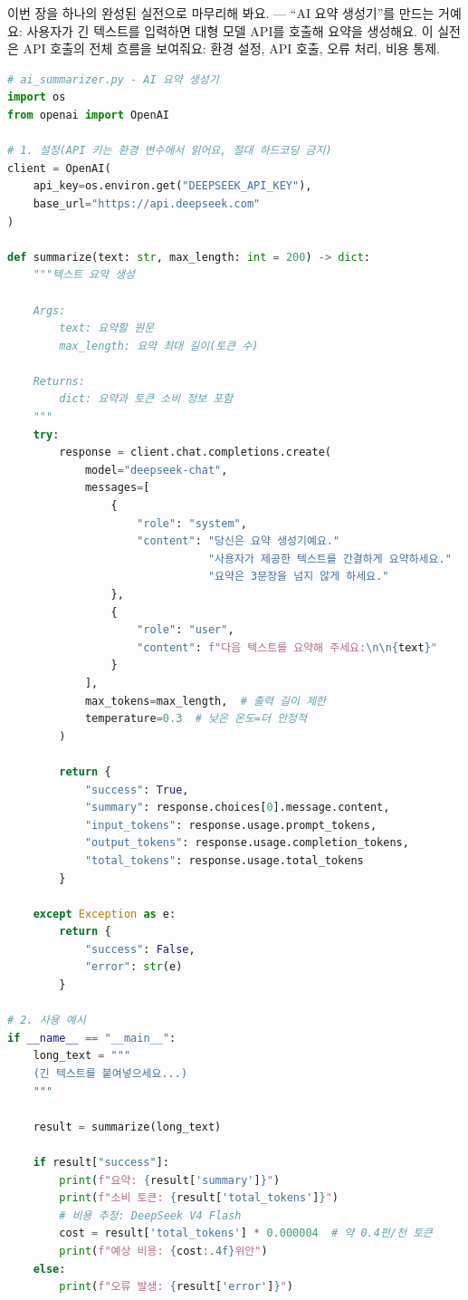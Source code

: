 
이번 장을 하나의 완성된 실전으로 마무리해 봐요. — “AI 요약 생성기”를 만드는 거예요: 사용자가 긴 텍스트를 입력하면 대형 모델 API를 호출해 요약을 생성해요. 이 실전은 API 호출의 전체 흐름을 보여줘요: 환경 설정, API 호출, 오류 처리, 비용 통제.

\begin{lstlisting}[language=Python]
# ai_summarizer.py - AI 요약 생성기
import os
from openai import OpenAI

# 1. 설정(API 키는 환경 변수에서 읽어요, 절대 하드코딩 금지)
client = OpenAI(
    api_key=os.environ.get("DEEPSEEK_API_KEY"),
    base_url="https://api.deepseek.com"
)

def summarize(text: str, max_length: int = 200) -> dict:
    """텍스트 요약 생성

    Args:
        text: 요약할 원문
        max_length: 요약 최대 길이(토큰 수)

    Returns:
        dict: 요약과 토큰 소비 정보 포함
    """
    try:
        response = client.chat.completions.create(
            model="deepseek-chat",
            messages=[
                {
                    "role": "system",
                    "content": "당신은 요약 생성기예요."
                               "사용자가 제공한 텍스트를 간결하게 요약하세요."
                               "요약은 3문장을 넘지 않게 하세요."
                },
                {
                    "role": "user",
                    "content": f"다음 텍스트를 요약해 주세요:\n\n{text}"
                }
            ],
            max_tokens=max_length,  # 출력 길이 제한
            temperature=0.3  # 낮은 온도=더 안정적
        )

        return {
            "success": True,
            "summary": response.choices[0].message.content,
            "input_tokens": response.usage.prompt_tokens,
            "output_tokens": response.usage.completion_tokens,
            "total_tokens": response.usage.total_tokens
        }

    except Exception as e:
        return {
            "success": False,
            "error": str(e)
        }

# 2. 사용 예시
if __name__ == "__main__":
    long_text = """
    (긴 텍스트를 붙여넣으세요...)
    """

    result = summarize(long_text)

    if result["success"]:
        print(f"요약: {result['summary']}")
        print(f"소비 토큰: {result['total_tokens']}")
        # 비용 추정: DeepSeek V4 Flash
        cost = result['total_tokens'] * 0.000004  # 약 0.4펀/천 토큰
        print(f"예상 비용: {cost:.4f}위안")
    else:
        print(f"오류 발생: {result['error']}")
\end{lstlisting}

